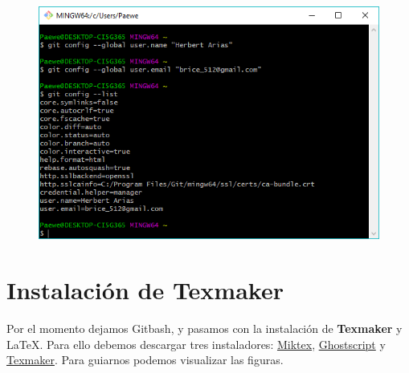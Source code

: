 \documentclass{article}
\begin{document}
\begin{figure}[h!]
  \centering
  \includegraphics[scale=0.75]{./imagenes/Gitbash5.png}
\end{figure}


\section{Instalación de Texmaker}%
Por el momento dejamos Gitbash, y pasamos con la instalación de \textbf{Texmaker} y \LaTeX.
Para ello debemos descargar tres instaladores: \href{https://miktex.org/download}{Miktex},
\href{https://www.ghostscript.com/download/gsdnld.html}{Ghostscript} y
\href{http://www.xm1math.net/texmaker/download.html}{Texmaker}. Para guiarnos
podemos visualizar las figuras.

\begin{figure}[h!]
  \centering
\end{figure}

\clearpage
\end{document}
